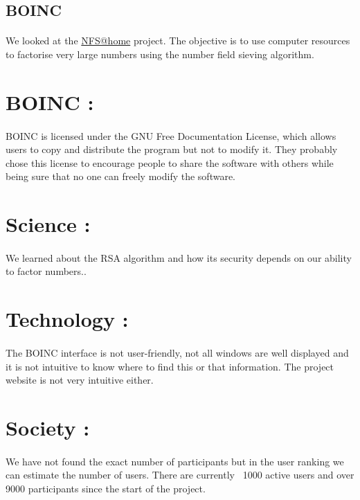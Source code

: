 \documentclass[14pt]
{article}
\newcommand\tab[1][1cm]{\hspace*{#1}}
\begin{document}
\pagestyle{fancy}
\chead{\textbf{\tab \tab Crowdsourcing and AI}}

\bigskip
\begin{center}
	\section*{\textbf{{\LARGE BOINC}}}
\end{center}
\bigskip\bigskip\bigskip

\paragraph*{}We looked at the \href{https://escatter11.fullerton.edu/nfs/}{NFS@home} project. The objective is to use computer resources to factorise very large numbers using the number field sieving algorithm.\\

\section*{BOINC :}
\paragraph*{} BOINC is licensed under the GNU Free Documentation License, which allows users to copy and distribute the program but not to modify it. They probably chose this license to encourage people to share the software with others while being sure that no one can freely modify the software.\\

\section*{Science :}
\paragraph*{} We learned about the RSA algorithm and how its security depends on our ability to factor numbers..\\

\section*{Technology :}
\paragraph*{} The BOINC interface is not user-friendly, not all windows are well displayed and it is not intuitive to know where to find this or that information. The project website is not very intuitive either.\\

\section*{Society :}
\paragraph*{}  We have not found the exact number of participants but in the user ranking we can estimate the number of users. There are currently ~1000 active users and over 9000 participants since the start of the project. \\
\end{document}

